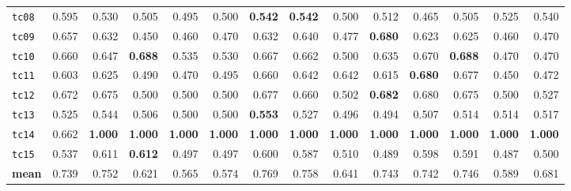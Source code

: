 \begin{table}[p]
\begin{tabular}{l r *{4}{r} *{4}{r} *{4}{r}}
\texttt{tc08} & 0.595 & 0.530 & 0.505 & 0.495 & 0.500 & \textbf{0.542} & \textbf{0.542} & 0.500 & 0.512 & 0.465 & 0.505 & 0.525 & 0.540 \\
\texttt{tc09} & 0.657 & 0.632 & 0.450 & 0.460 & 0.470 & 0.632 & 0.640 & 0.477 & \textbf{0.680} & 0.623 & 0.625 & 0.460 & 0.470 \\
\texttt{tc10} & 0.660 & 0.647 & \textbf{0.688} & 0.535 & 0.530 & 0.667 & 0.662 & 0.500 & 0.635 & 0.670 & \textbf{0.688} & 0.470 & 0.470 \\
\texttt{tc11} & 0.603 & 0.625 & 0.490 & 0.470 & 0.495 & 0.660 & 0.642 & 0.642 & 0.615 & \textbf{0.680} & 0.677 & 0.450 & 0.472 \\
\texttt{tc12} & 0.672 & 0.675 & 0.500 & 0.500 & 0.500 & 0.677 & 0.660 & 0.502 & \textbf{0.682} & 0.680 & 0.675 & 0.500 & 0.527 \\
\texttt{tc13} & 0.525 & 0.544 & 0.506 & 0.500 & 0.500 & \textbf{0.553} & 0.527 & 0.496 & 0.494 & 0.507 & 0.514 & 0.514 & 0.517 \\
\texttt{tc14} & 0.662 & \textbf{1.000} & \textbf{1.000} & \textbf{1.000} & \textbf{1.000} & \textbf{1.000} & \textbf{1.000} & \textbf{1.000} & \textbf{1.000} & \textbf{1.000} & \textbf{1.000} & \textbf{1.000} & \textbf{1.000} \\
\texttt{tc15} & 0.537 & 0.611 & \textbf{0.612} & 0.497 & 0.497 & 0.600 & 0.587 & 0.510 & 0.489 & 0.598 & 0.591 & 0.487 & 0.500 \\
\midrule
\textbf{mean} & 0.739 & 0.752 & 0.621 & 0.565 & 0.574 & 0.769 & 0.758 & 0.641 & 0.743 & 0.742 & 0.746 & 0.589 & 0.681 \\
\bottomrule
\end{tabular}
\end{table}
